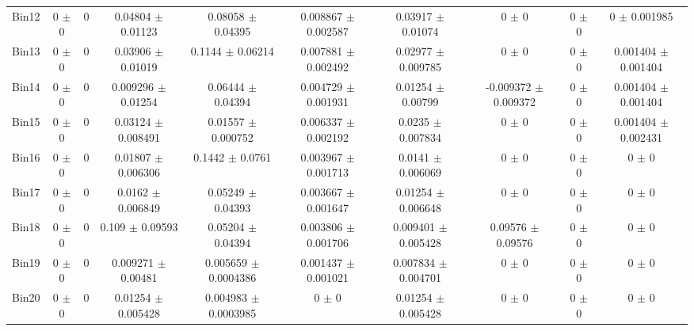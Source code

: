 \begin{tabular}{@{\extracolsep{4pt}}lccccccccc@{}}
     Bin12 & 0 $\pm$ 0 & 0 & 0.04804 $\pm$ 0.01123 & 0.08058 $\pm$ 0.04395 & 0.008867 $\pm$ 0.002587 & 0.03917 $\pm$ 0.01074 & 0 $\pm$ 0 & 0 $\pm$ 0 & 0 $\pm$ 0.001985 \\ 
     Bin13 & 0 $\pm$ 0 & 0 & 0.03906 $\pm$ 0.01019 & 0.1144 $\pm$ 0.06214 & 0.007881 $\pm$ 0.002492 & 0.02977 $\pm$ 0.009785 & 0 $\pm$ 0 & 0 $\pm$ 0 & 0.001404 $\pm$ 0.001404 \\ 
     Bin14 & 0 $\pm$ 0 & 0 & 0.009296 $\pm$ 0.01254 & 0.06444 $\pm$ 0.04394 & 0.004729 $\pm$ 0.001931 & 0.01254 $\pm$ 0.00799 & -0.009372 $\pm$ 0.009372 & 0 $\pm$ 0 & 0.001404 $\pm$ 0.001404 \\ 
     Bin15 & 0 $\pm$ 0 & 0 & 0.03124 $\pm$ 0.008491 & 0.01557 $\pm$ 0.000752 & 0.006337 $\pm$ 0.002192 & 0.0235 $\pm$ 0.007834 & 0 $\pm$ 0 & 0 $\pm$ 0 & 0.001404 $\pm$ 0.002431 \\ 
     Bin16 & 0 $\pm$ 0 & 0 & 0.01807 $\pm$ 0.006306 & 0.1442 $\pm$ 0.0761 & 0.003967 $\pm$ 0.001713 & 0.0141 $\pm$ 0.006069 & 0 $\pm$ 0 & 0 $\pm$ 0 & 0 $\pm$ 0 \\ 
     Bin17 & 0 $\pm$ 0 & 0 & 0.0162 $\pm$ 0.006849 & 0.05249 $\pm$ 0.04393 & 0.003667 $\pm$ 0.001647 & 0.01254 $\pm$ 0.006648 & 0 $\pm$ 0 & 0 $\pm$ 0 & 0 $\pm$ 0 \\ 
     Bin18 & 0 $\pm$ 0 & 0 & 0.109 $\pm$ 0.09593 & 0.05204 $\pm$ 0.04394 & 0.003806 $\pm$ 0.001706 & 0.009401 $\pm$ 0.005428 & 0.09576 $\pm$ 0.09576 & 0 $\pm$ 0 & 0 $\pm$ 0 \\ 
     Bin19 & 0 $\pm$ 0 & 0 & 0.009271 $\pm$ 0.00481 & 0.005659 $\pm$ 0.0004386 & 0.001437 $\pm$ 0.001021 & 0.007834 $\pm$ 0.004701 & 0 $\pm$ 0 & 0 $\pm$ 0 & 0 $\pm$ 0 \\ 
     Bin20 & 0 $\pm$ 0 & 0 & 0.01254 $\pm$ 0.005428 & 0.004983 $\pm$ 0.0003985 & 0 $\pm$ 0 & 0.01254 $\pm$ 0.005428 & 0 $\pm$ 0 & 0 $\pm$ 0 & 0 $\pm$ 0 \\ 
\hline\hline
  \end{tabular}
